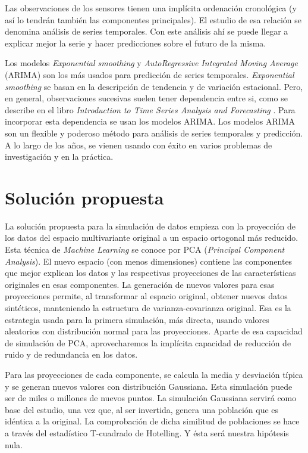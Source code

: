 \documentclass[11pt,spanish,listoffigures,listoftables]{tfgetsinf}
\begin{document}
Las observaciones de los sensores tienen una implícita ordenación cronológica (y así lo tendrán también las componentes principales). El estudio de esa relación se denomina análisis de series temporales. Con este análisis ahí se puede llegar a explicar mejor la serie y hacer predicciones sobre el futuro de la misma. 

Los modelos {\em Exponential smoothing} y {\em AutoRegressive Integrated Moving Average} (ARIMA) son los más usados para predicción de series temporales. {\em Exponential smoothing} se basan en la descripción de tendencia y de variación estacional. Pero, en general, observaciones sucesivas suelen tener dependencia entre si, como se describe en el libro \textit{Introduction to Time Series Analysis and Forecasting} \cite{montgomery}. Para incorporar esta dependencia se usan los modelos ARIMA. Los modelos ARIMA son un flexible y poderoso método para análisis de series temporales y predicción. A lo largo de los años, se vienen usando con éxito en varios problemas de investigación y en la práctica.

\chapter{Solución propuesta}
La solución propuesta para la simulación de datos empieza con la proyección de los datos del espacio multivariante original a un espacio ortogonal más reducido. Esta técnica de {\em Machine Learning} se conoce por PCA ({\em Principal Component Analysis}). El nuevo espacio (con menos dimensiones) contiene las componentes que mejor explican los datos y las respectivas proyecciones de las características originales en esas componentes. La generación de nuevos valores para esas proyecciones permite, al transformar al espacio original, obtener nuevos datos sintéticos, manteniendo la estructura de varianza-covarianza original. Esa es la estrategia usada para la primera simulación, más directa, usando valores aleatorios con distribución normal para las proyecciones. Aparte de esa capacidad de simulación de PCA, aprovecharemos la implícita capacidad de reducción de ruido y de redundancia en los datos.

Para las proyecciones de cada componente, se calcula la media y desviación típica y se generan nuevos valores con distribución Gaussiana. Esta simulación puede ser de miles o millones de nuevos puntos. La simulación Gaussiana servirá como base del estudio, una vez que, al ser invertida, genera una población que es idéntica a la original. La comprobación de dicha similitud de poblaciones se hace a través del estadístico T-cuadrado de Hotelling. Y ésta será nuestra hipótesis nula.
\end{document}
